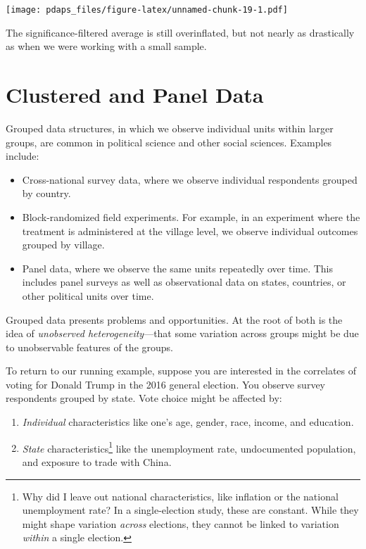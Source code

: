 \documentclass[
  12pt,
  oneside,openany]{book}
\begin{document}
\texttt{[image: pdaps\_files/figure-latex/unnamed-chunk-19-1.pdf]}

The significance-filtered average is still overinflated, but not nearly as drastically as when we were working with a small sample.

\hypertarget{panel}{%
\chapter{Clustered and Panel Data}\label{panel}}

Grouped data structures, in which we observe individual units within larger groups, are common in political science and other social sciences. Examples include:

\begin{itemize}
\item
  Cross-national survey data, where we observe individual respondents grouped by country.
\item
  Block-randomized field experiments. For example, in an experiment where the treatment is administered at the village level, we observe individual outcomes grouped by village.
\item
  Panel data, where we observe the same units repeatedly over time. This includes panel surveys as well as observational data on states, countries, or other political units over time.
\end{itemize}

Grouped data presents problems and opportunities. At the root of both is the idea of \emph{unobserved heterogeneity}---that some variation across groups might be due to unobservable features of the groups.

To return to our running example, suppose you are interested in the correlates of voting for Donald Trump in the 2016 general election. You observe survey respondents grouped by state. Vote choice might be affected by:

\begin{enumerate}
\def\labelenumi{\arabic{enumi}.}
\item
  \emph{Individual} characteristics like one's age, gender, race, income, and education.
\item
  \emph{State} characteristics\footnote{Why did I leave out national characteristics, like inflation or the national unemployment rate? In a single-election study, these are constant. While they might shape variation \emph{across} elections, they cannot be linked to variation \emph{within} a single election.} like the unemployment rate, undocumented population, and exposure to trade with China.
\end{enumerate}
\end{document}
